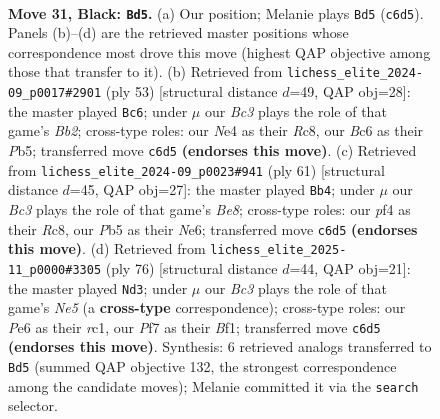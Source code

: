 \documentclass[11pt]{article}
\begin{document}
\clearpage

\begin{figure}[p]\centering
\begin{subfigure}{0.46\textwidth}\centering
\resizebox{\linewidth}{!}{%
\newchessgame
\chessboard[
  setfen={6k1/2R2pp1/2b1p3/1p5p/1r1PnP1P/4P1P1/8/3N1BK1 b - - 1 31},
  showmover=false,
  pgfstyle=straightmove, color=movearrow, markmove={c6-d5}
]}
\caption{}
\end{subfigure}\hfill
\begin{subfigure}{0.46\textwidth}\centering
\resizebox{\linewidth}{!}{%
\newchessgame
\chessboard[
  setfen={2r5/1b4pk/1R3p2/pp6/3Bn2P/PP6/2P3P1/4NK2 b - - 5 27},
  showmover=false,
  pgfstyle=straightmove, color=movearrow, markmove={b7-c6}
]}
\caption{}
\end{subfigure}
\\[4pt]
\begin{subfigure}{0.46\textwidth}\centering
\resizebox{\linewidth}{!}{%
\newchessgame
\chessboard[
  setfen={2r5/1p3k1p/1B2npp1/p2p4/P7/1P2N1PP/2P2P2/3Rb1K1 b - - 1 31},
  showmover=false,
  pgfstyle=straightmove, color=movearrow, markmove={e1-b4}
]}
\caption{}
\end{subfigure}\hfill
\begin{subfigure}{0.46\textwidth}\centering
\resizebox{\linewidth}{!}{%
\newchessgame
\chessboard[
  setfen={5k2/1b4p1/1P1n1p1p/p2PN3/1p2P3/1R3PPP/5K2/2r2B2 w - - 0 39},
  showmover=false,
  pgfstyle=straightmove, color=movearrow, markmove={e5-d3}
]}
\caption{}
\end{subfigure}
\caption{\textbf{Move 31, Black: \texttt{Bd5}.} (a) Our position; Melanie plays \texttt{Bd5} (\texttt{c6d5}). Panels (b)--(d) are the retrieved master positions whose correspondence most drove this move (highest QAP objective among those that transfer to it). (b) Retrieved from \texttt{lichess\_elite\_2024-09\_p0017\#2901} (ply 53) [structural distance $d$=49, QAP obj=28]: the master played \texttt{Bc6}; under $\mu$ our \emph{Bc3} plays the role of that game's \emph{Bb2}; cross-type roles: our \emph{N}e4 as their \emph{R}c8, our \emph{B}c6 as their \emph{P}b5; transferred move \texttt{c6d5} \textbf{(endorses this move)}. (c) Retrieved from \texttt{lichess\_elite\_2024-09\_p0023\#941} (ply 61) [structural distance $d$=45, QAP obj=27]: the master played \texttt{Bb4}; under $\mu$ our \emph{Bc3} plays the role of that game's \emph{Be8}; cross-type roles: our \emph{p}f4 as their \emph{R}c8, our \emph{P}b5 as their \emph{N}e6; transferred move \texttt{c6d5} \textbf{(endorses this move)}. (d) Retrieved from \texttt{lichess\_elite\_2025-11\_p0000\#3305} (ply 76) [structural distance $d$=44, QAP obj=21]: the master played \texttt{Nd3}; under $\mu$ our \emph{Bc3} plays the role of that game's \emph{Ne5} (a \textbf{cross-type} correspondence); cross-type roles: our \emph{P}e6 as their \emph{r}c1, our \emph{P}f7 as their \emph{B}f1; transferred move \texttt{c6d5} \textbf{(endorses this move)}. Synthesis: 6 retrieved analogs transferred to \texttt{Bd5} (summed QAP objective 132, the strongest correspondence among the candidate moves); Melanie committed it via the \texttt{search} selector.}
\label{fig:thought-m61}
\end{figure}
\end{document}
